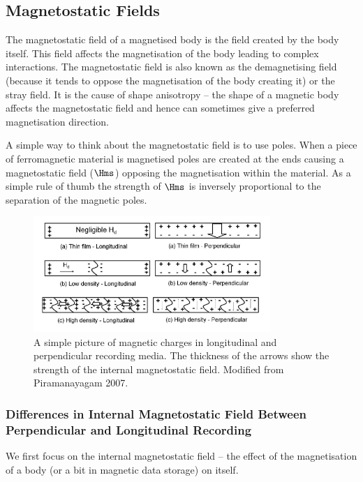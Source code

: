 \subsection{Magnetostatic Fields}

The magnetostatic field of a magnetised body is the field created by the body
itself. This field affects the magnetisation of the body leading to complex
interactions. The magnetostatic field is also known as the demagnetising field
(because it tends to oppose the magnetisation of the body creating it) or the
stray field. It is the cause of shape anisotropy -- the shape of a magnetic body
affects the magnetostatic field and hence can sometimes give a preferred
magnetisation direction.

A simple way to think about the magnetostatic field is to use poles. When a
piece of ferromagnetic material is magnetised poles are created at the ends
causing a magnetostatic field ($\Hms$) opposing the magnetisation within the
material. As a simple rule of thumb the strength of $\Hms$ is inversely
proportional to the separation of the magnetic poles. \cite{Piramanayagam2007a}

\begin{figure}[!ht]
  \center
  \includegraphics[width=0.8\textwidth]{./images/demagsimple}
  \caption{
    A simple picture of magnetic charges in longitudinal and perpendicular
    recording media. The thickness of the arrows show the strength of the
    internal magnetostatic field.  Modified from Piramanayagam
    2007. \cite{Piramanayagam2007a}}
  \label{fig:simple-picture-demag}
\end{figure}


\subsubsection{Differences in Internal Magnetostatic Field Between Perpendicular and Longitudinal Recording}
\label{sec:diff-intern-magn}
We first focus on the internal magnetostatic field -- the effect of the magnetisation of a body (or a bit in magnetic data storage) on itself.

